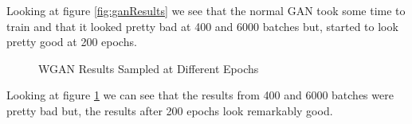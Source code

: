 \documentclass[12pt,
 reprint,
nofootinbib,
 amsmath,amssymb,
 aps,
floatfix,
]{revtex4-2}
\begin{document}
Looking at figure \ref{fig:ganResults} we see that the normal GAN took some time to train and that it looked pretty bad at 400 and 6000 batches but, started to look pretty good at 200 epochs. 


\begin{figure}[h!]
    \centering
    \qquad
    \qquad
    \caption{WGAN Results Sampled at Different Epochs}%
    \label{fig:wganResults}%
\end{figure}

Looking at figure \ref{fig:wganResults} we can see that the results from 400 and 6000 batches were pretty bad but, the results after 200 epochs look remarkably good.
\end{document}
